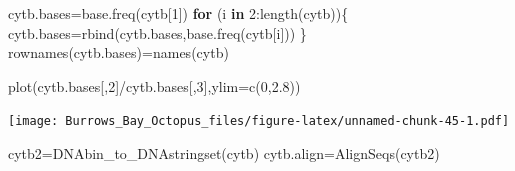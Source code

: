 \documentclass[
]{article}
\newenvironment{Shaded}{\begin{snugshade}}{\end{snugshade}}
\newcommand{\AttributeTok}[1]{\textcolor[rgb]{0.77,0.63,0.00}{#1}}
\newcommand{\ControlFlowTok}[1]{\textcolor[rgb]{0.13,0.29,0.53}{\textbf{#1}}}
\newcommand{\DecValTok}[1]{\textcolor[rgb]{0.00,0.00,0.81}{#1}}
\newcommand{\FloatTok}[1]{\textcolor[rgb]{0.00,0.00,0.81}{#1}}
\newcommand{\FunctionTok}[1]{\textcolor[rgb]{0.00,0.00,0.00}{#1}}
\newcommand{\NormalTok}[1]{#1}
\newcommand{\OtherTok}[1]{\textcolor[rgb]{0.56,0.35,0.01}{#1}}
\newcommand{\SpecialCharTok}[1]{\textcolor[rgb]{0.00,0.00,0.00}{#1}}
\begin{document}
\begin{Shaded}
\begin{Highlighting}[]
\NormalTok{cytb.bases}\OtherTok{=}\FunctionTok{base.freq}\NormalTok{(cytb[}\DecValTok{1}\NormalTok{])}
\ControlFlowTok{for}\NormalTok{ (i }\ControlFlowTok{in} \DecValTok{2}\SpecialCharTok{:}\FunctionTok{length}\NormalTok{(cytb))\{}
\NormalTok{  cytb.bases}\OtherTok{=}\FunctionTok{rbind}\NormalTok{(cytb.bases,}\FunctionTok{base.freq}\NormalTok{(cytb[i]))  }
\NormalTok{\}}
\FunctionTok{rownames}\NormalTok{(cytb.bases)}\OtherTok{=}\FunctionTok{names}\NormalTok{(cytb)}
\end{Highlighting}
\end{Shaded}

\begin{Shaded}
\begin{Highlighting}[]
\FunctionTok{plot}\NormalTok{(cytb.bases[,}\DecValTok{2}\NormalTok{]}\SpecialCharTok{/}\NormalTok{cytb.bases[,}\DecValTok{3}\NormalTok{],}\AttributeTok{ylim=}\FunctionTok{c}\NormalTok{(}\DecValTok{0}\NormalTok{,}\FloatTok{2.8}\NormalTok{))}
\end{Highlighting}
\end{Shaded}

\texttt{[image: Burrows\_Bay\_Octopus\_files/figure-latex/unnamed-chunk-45-1.pdf]}

\begin{Shaded}
\begin{Highlighting}[]
\NormalTok{cytb2}\OtherTok{=}\FunctionTok{DNAbin\_to\_DNAstringset}\NormalTok{(cytb)}
\NormalTok{cytb.align}\OtherTok{=}\FunctionTok{AlignSeqs}\NormalTok{(cytb2)}
\end{Highlighting}
\end{Shaded}
\end{document}
